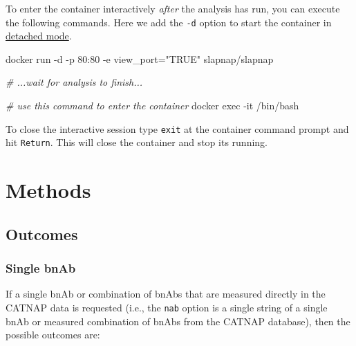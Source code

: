 \documentclass[
]{article}
\newenvironment{Shaded}{\begin{snugshade}}{\end{snugshade}}
\newcommand{\CommentTok}[1]{\textcolor[rgb]{0.56,0.35,0.01}{\textit{#1}}}
\newcommand{\ExtensionTok}[1]{#1}
\newcommand{\NormalTok}[1]{#1}
\newcommand{\StringTok}[1]{\textcolor[rgb]{0.31,0.60,0.02}{#1}}
\begin{document}
To enter the container interactively \emph{after} the analysis has run, you can execute the following commands. Here we add the \texttt{-d} option to start the container in \href{https://docs.docker.com/engine/reference/run/\#detached--d}{detached mode}.

\begin{Shaded}
\begin{Highlighting}[]
\ExtensionTok{docker}\NormalTok{ run {-}d {-}p 80:80 {-}e view\_port=}\StringTok{"TRUE"}\NormalTok{ slapnap/slapnap}

\CommentTok{\# ...wait for analysis to finish...}

\CommentTok{\# use this command to enter the container}
\ExtensionTok{docker}\NormalTok{ exec {-}it /bin/bash}
\end{Highlighting}
\end{Shaded}

To close the interactive session type \texttt{exit} at the container command prompt and hit \texttt{Return}. This will close the container and stop its running.

\hypertarget{sec:methods}{%
\section{Methods}\label{sec:methods}}

\hypertarget{sec:outcomedefs}{%
\subsection{Outcomes}\label{sec:outcomedefs}}

\hypertarget{single-bnab}{%
\subsubsection{Single bnAb}\label{single-bnab}}

If a single bnAb or combination of bnAbs that are measured directly in the CATNAP data is requested (i.e., the \texttt{nab} option is a single string of a single bnAb or measured combination of bnAbs from the CATNAP database), then the possible outcomes are:
\end{document}

